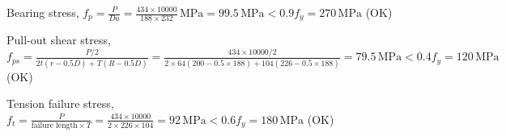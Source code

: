 \documentclass[a4paper,10pt]{article}
\begin{document}
Bearing stress, 
$f_p = \frac{P}{Da} = \frac{434 \times 10000}{188 \times 232}\,\mathrm{MPa}
                    = 99.5\,\mathrm{MPa} < 0.9f_y = 270\,\mathrm{MPa}$ (OK)

Pull-out shear stress,
$f_{ps} = \frac{P/2}{2t(r-0.5D) + T(R-0.5D)}
        = \frac{434 \times 10000 / 2}
               {2 \times 64(200-0.5\times188) + 104(226-0.5\times188)}
        = 79.5\,\mathrm{MPa} < 0.4f_y = 120\,\mathrm{MPa}$ (OK)

Tension failure stress,
$f_t = \frac{P}{\text{failure length} \times T}
     = \frac{434 \times 10000}{2 \times 226 \times 104}
     = 92\,\mathrm{MPa} < 0.6f_y = 180\,\mathrm{MPa}$ (OK)


\end{document}
